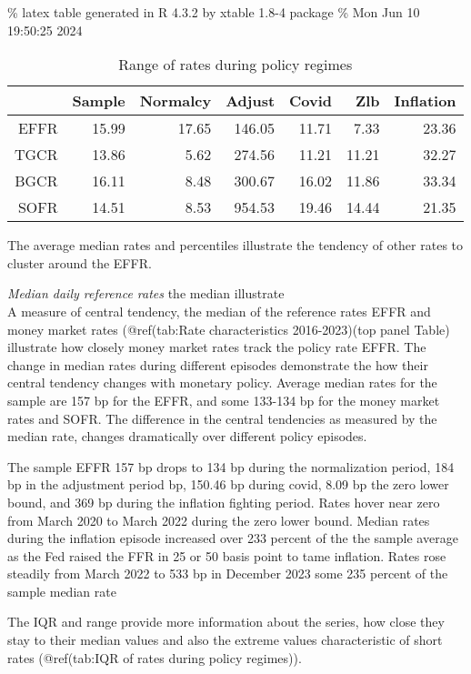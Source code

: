\documentclass[
]{article}
\begin{document}
\% latex table generated in R 4.3.2 by xtable 1.8-4 package
\% Mon Jun 10 19:50:25 2024

\begin{table}[ht]
\centering
\begin{tabular}{rrrrrrr}
  \hline
 & Sample & Normalcy & Adjust & Covid & Zlb & Inflation \\ 
  \hline
EFFR & 15.99 & 17.65 & 146.05 & 11.71 & 7.33 & 23.36 \\ 
  TGCR & 13.86 & 5.62 & 274.56 & 11.21 & 11.21 & 32.27 \\ 
  BGCR & 16.11 & 8.48 & 300.67 & 16.02 & 11.86 & 33.34 \\ 
  SOFR & 14.51 & 8.53 & 954.53 & 19.46 & 14.44 & 21.35 \\ 
   \hline
\end{tabular}
\caption{Range of rates during policy regimes} 
\end{table}

The average median rates and percentiles illustrate the tendency of other rates to cluster around the EFFR.

\emph{Median daily reference rates}
the median illustrate\\
A measure of central tendency, the median of the reference rates EFFR and money market rates (@ref(tab:Rate characteristics 2016-2023)(top panel Table) illustrate how closely money market rates track the policy rate EFFR. The change in median rates during different episodes demonstrate the how their central tendency changes with monetary policy. Average median rates for the sample are 157 bp for the EFFR, and some 133-134 bp for the money market rates and SOFR. The difference in the central tendencies as measured by the median rate, changes dramatically over different policy episodes.

The sample EFFR 157 bp drops to 134 bp during the normalization period, 184 bp in the adjustment period bp, 150.46 bp during covid, 8.09 bp the zero lower bound, and 369 bp during the inflation fighting period. Rates hover near zero from March 2020 to March 2022 during the zero lower bound. Median rates during the inflation episode increased over 233 percent of the the sample average as the Fed raised the FFR in 25 or 50 basis point to tame inflation. Rates rose steadily from March 2022 to 533 bp in December 2023 some 235 percent of the sample median rate

The IQR and range provide more information about the series, how close they stay to their median values and also the extreme values characteristic of short rates (@ref(tab:IQR of rates during policy regimes)).
\end{document}
